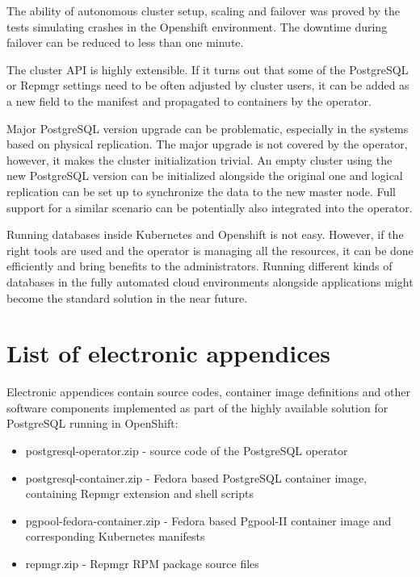 \documentclass[
  digital, %
  twoside, %
  table,   %
  lof,     %
  lot,     %
]{fithesis3}
\begin{document}
The ability of autonomous cluster setup, scaling and failover was proved by the tests simulating crashes in the Openshift environment. The downtime during failover can be reduced to less than one minute.

The cluster API is highly extensible. If it turns out that some of the PostgreSQL or Repmgr settings need to be often adjusted by cluster users, it can be added as a new field to the manifest and propagated to containers by the operator.

Major PostgreSQL version upgrade can be problematic, especially in the systems based on physical replication. The major upgrade is not covered by the operator, however, it makes the cluster initialization trivial. An empty cluster using the new PostgreSQL version can be initialized alongside the original one and logical replication can be set up to synchronize the data to the new master node. Full support for a similar scenario can be potentially also integrated into the operator.

Running databases inside Kubernetes and Openshift is not easy. However, if the right tools are used and the operator is managing all the resources, it can be done efficiently and bring benefits to the administrators. Running different kinds of databases in the fully automated cloud environments alongside applications might become the standard solution in the near future.


\appendix %
\chapter{List of electronic appendices} \label{chap:appendices}
Electronic appendices contain source codes, container image definitions and other software components implemented as part of the highly available solution for PostgreSQL running in OpenShift:
\begin{itemize}
  \item postgresql-operator.zip - source code of the PostgreSQL operator
  \item postgresql-container.zip - Fedora based PostgreSQL container image, containing Repmgr extension and shell scripts
  \item pgpool-fedora-container.zip - Fedora based Pgpool-II container image and corresponding Kubernetes manifests
  \item repmgr.zip - Repmgr RPM package source files
\end{itemize}
\end{document}
